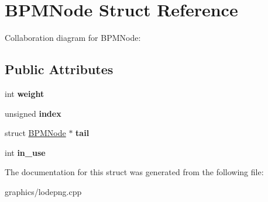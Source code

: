 \hypertarget{struct_b_p_m_node}{\section{B\+P\+M\+Node Struct Reference}
\label{struct_b_p_m_node}
}


Collaboration diagram for B\+P\+M\+Node\+:
\subsection*{Public Attributes}
\begin{DoxyCompactItemize}
\item 
\hypertarget{struct_b_p_m_node_a349ff0204b52858db88a47940509f14e}{int {\bfseries weight}}\label{struct_b_p_m_node_a349ff0204b52858db88a47940509f14e}

\item 
\hypertarget{struct_b_p_m_node_a8a77213810f8e491f8d1f7d8793b641f}{unsigned {\bfseries index}}\label{struct_b_p_m_node_a8a77213810f8e491f8d1f7d8793b641f}

\item 
\hypertarget{struct_b_p_m_node_a03f3ca43fe1eb8bee70592ebff763934}{struct \hyperlink{struct_b_p_m_node}{B\+P\+M\+Node} $\ast$ {\bfseries tail}}\label{struct_b_p_m_node_a03f3ca43fe1eb8bee70592ebff763934}

\item 
\hypertarget{struct_b_p_m_node_ae0117b99903b29d19f41e0c242c25dca}{int {\bfseries in\+\_\+use}}\label{struct_b_p_m_node_ae0117b99903b29d19f41e0c242c25dca}

\end{DoxyCompactItemize}


The documentation for this struct was generated from the following file\+:\begin{DoxyCompactItemize}
\item 
graphics/lodepng.\+cpp\end{DoxyCompactItemize}
